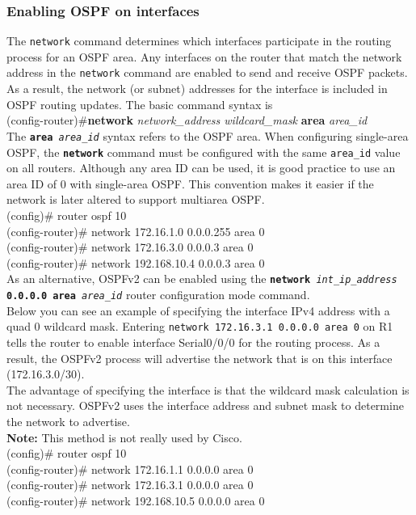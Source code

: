 \subsubsection*{Enabling OSPF on interfaces}
\textrm{The \texttt{network} command determines which interfaces participate in the routing process for an OSPF area. Any interfaces on the router that match the network address in the \texttt{network} command are enabled to send and receive OSPF packets. As a result, the network (or subnet) addresses for the interface is included in OSPF routing updates. The basic command syntax is}\vspace{8pt}\\
(config-router)\#\textbf{network} \textit{network\_address wildcard\_mask} \textbf{area} \textit{area\_id}\vspace{11pt}\\
\textrm{The \texttt{\textbf{area} \textit{area\_id}} syntax refers to the OSPF area. When configuring single-area OSPF, the \texttt{\textbf{network}} command must be configured with the same \texttt{area\_id} value on all routers. Although any area ID can be used, it is good practice to use an area ID of 0 with single-area OSPF. This convention makes it easier if the network is later altered to support multiarea OSPF.}\vspace{8pt}\\
(config)\# router ospf 10\\
(config-router)\# network 172.16.1.0 0.0.0.255 area 0\\
(config-router)\# network 172.16.3.0 0.0.0.3 area 0\\
(config-router)\# network 192.168.10.4 0.0.0.3 area 0\vspace{11pt}\\
\textrm{As an alternative, OSPFv2 can be enabled using the \texttt{\textbf{network} \textit{int\_ip\_address} \\\textbf{0.0.0.0} \textbf{area} \textit{area\_id}} router configuration mode command.\\
Below you can see an example of specifying the interface IPv4 address with a quad 0 wildcard mask. Entering \texttt{network 172.16.3.1 0.0.0.0 area 0} on R1 tells the router to enable interface Serial0/0/0 for the routing process. As a result, the OSPFv2 process will advertise the network that is on this interface (172.16.3.0/30).\\
The advantage of specifying the interface is that the wildcard mask calculation is not necessary. OSPFv2 uses the interface address and subnet mask to determine the network to advertise.\\
\textbf{Note:} This method is not really used by Cisco.}\vspace{8pt}\\
(config)\# router ospf 10\\
(config-router)\# network 172.16.1.1 0.0.0.0 area 0\\
(config-router)\# network 172.16.3.1 0.0.0.0 area 0\\
(config-router)\# network 192.168.10.5 0.0.0.0 area 0
